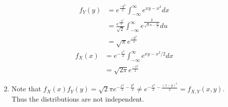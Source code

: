 \documentclass[12pt, letterpaper]{article}
\begin{document}
\begin{enumerate}
\begin{enumerate}
\begin{align*}
			f_Y(y) &= e^{\frac{-y^2}{2}} \int_{-\infty}^\infty e^{xy-x^2} dx\\
			&= \frac{e^{\frac{-y^2}{2}}}{\sqrt{2}} \int_{-\infty}^\infty e^{\frac{y}{\sqrt{2}u - \frac{u^2}{2}}} du\\
			&= \sqrt{\pi} e^{\frac{-y^2}{4}}
		\end{align*}
		\begin{align*}
			f_X(x) &= e^{-\frac{x^2}{2}} \int_{-\infty}^\infty e^{xy - x^2/2} dx\\
			&= \sqrt{2 \pi} e^{\frac{-x^2}{2}}
		\end{align*}
		\item Note that $f_X(x) f_Y(y) = \sqrt{2}\pi e^{-\frac{x^2}{2}-\frac{y^2}{4}} \neq e^{-\frac{x^2}{2}-\frac{(x-y)^2}{2}} = f_{X,Y}(x,y)$.  Thus the distributions are not independent.  
	\end{enumerate}
\end{enumerate}
\end{document}
